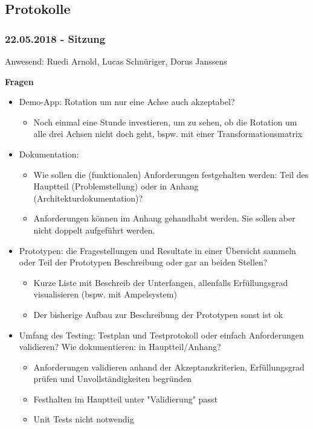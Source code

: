 \subsection{Protokolle}


\subsubsection*{22.05.2018 - Sitzung}

Anwesend: Ruedi Arnold, Lucas Schnüriger, Dorus Janssens

\textbf{Fragen}
\begin{itemize}
	\item Demo-App: Rotation um nur eine Achse auch akzeptabel?
	\begin{itemize}
		\item Noch einmal eine Stunde investieren, um zu sehen, ob die Rotation um alle drei Achsen nicht doch geht, bspw. mit einer Transformationsmatrix
	\end{itemize}
	\item Dokumentation:
	\begin{itemize}
		\item Wie sollen die (funktionalen) Anforderungen festgehalten werden: Teil des Hauptteil (Problemstellung) oder in Anhang (Architekturdokumentation)?
		\item Anforderungen können im Anhang gehandhabt werden. Sie sollen aber nicht doppelt aufgeführt werden.
	\end{itemize}
	\item Prototypen: die Fragestellungen und Resultate in einer Übersicht sammeln oder Teil der Prototypen Beschreibung oder gar an beiden Stellen?
	\begin{itemize}
		\item Kurze Liste mit Beschreib der Unterfangen, allenfalls Erfüllungsgrad visualisieren (bspw. mit Ampelsystem)
		\item Der bisherige Aufbau zur Beschreibung der Prototypen sonst ist ok
	\end{itemize}
	\item Umfang des Testing: Testplan und Testprotokoll oder einfach Anforderungen validieren? Wie dokumentieren: in Hauptteil/Anhang?
	\begin{itemize}
		\item Anforderungen validieren anhand der Akzeptanzkriterien, Erfüllungsgrad prüfen und Unvollständigkeiten begründen
		\item Festhalten im Hauptteil unter "Validierung" passt
		\item Unit Tests nicht notwendig
	\end{itemize}
\end{itemize}

